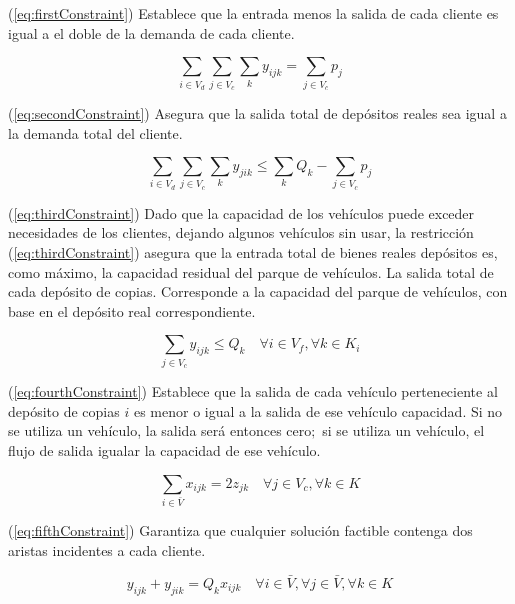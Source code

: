 \documentclass[letter, 10pt]{article}
\begin{document}
(\ref{eq:firstConstraint}) Establece que la entrada menos la salida de cada cliente es igual a el doble de la demanda de cada cliente.

\begin{equation}
    \label{eq:secondConstraint}
    \sum_{i \in V_{d}} \sum_{j \in V_{c}} \sum_{k}{y_{ijk}} = \sum_{j \in V_{c}}{p_{j}}
\end{equation}

(\ref{eq:secondConstraint}) Asegura que la salida total de depósitos reales sea igual a la demanda total del cliente.

\begin{equation}
    \label{eq:thirdConstraint}
    \sum_{i \in V_{d}} \sum_{j \in V_{c}} \sum_{k}{y_{jik}} \leq \sum_{k}{Q_{k}} - \sum_{j \in V_{c}}{p_{j}}
\end{equation}

(\ref{eq:thirdConstraint})  Dado que la capacidad de los vehículos puede exceder necesidades de los clientes, dejando algunos vehículos sin usar, la restricción  (\ref{eq:thirdConstraint}) asegura que la entrada total de bienes reales depósitos es, como máximo, la capacidad residual del parque de vehículos. La salida total de cada depósito de copias. Corresponde a la capacidad del parque de vehículos, con base en el depósito real correspondiente.

\begin{equation}
    \label{eq:fourthConstraint}
    \sum_{j \in V_{c}}{y_{ijk}} \leq Q_{k} \quad \forall i \in V_{f}, \forall k \in K_{i}
\end{equation}

(\ref{eq:fourthConstraint}) Establece que la salida de cada vehículo perteneciente al depósito de copias $i$ es menor o igual a la salida de ese vehículo capacidad. Si no se utiliza un vehículo, la salida será entonces cero$;$ si se utiliza un vehículo, el flujo de salida igualar la capacidad de ese vehículo.

\begin{equation}
    \label{eq:fifthConstraint}
    \sum_{i \in \bar{V}}{x_{ijk}} = 2z_{jk} \quad \forall j \in V_{c}, \forall k \in K
\end{equation}

(\ref{eq:fifthConstraint}) Garantiza que cualquier solución factible contenga dos aristas incidentes a cada cliente.

\begin{equation}
    \label{eq:sixthConstraint}
    y_{ijk} + y_{jik} = Q_{k}x_{ijk} \quad \forall i \in \bar{V}, \forall j \in \bar{V}, \forall k \in K
\end{equation}
\end{document}
